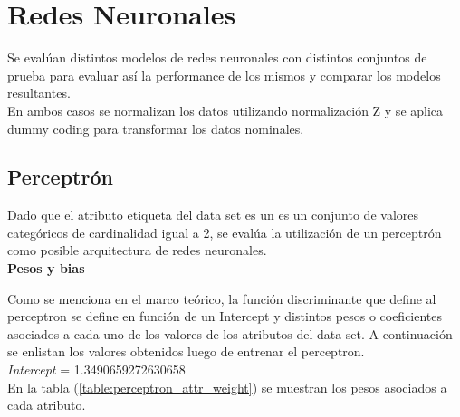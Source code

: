 \documentclass[osajnl,twocolumn,showpacs,superscriptaddress,10pt,floatfix]{revtex4-1} %
\begin{document}
\section{Redes Neuronales}

Se evalúan distintos modelos de redes neuronales con distintos conjuntos de prueba para evaluar así la performance de los mismos y comparar los modelos resultantes. \\

En ambos casos se normalizan los datos utilizando normalización Z y se aplica dummy coding para transformar los datos nominales. \\

\subsection{Perceptrón}

Dado que el atributo etiqueta del data set es un es un conjunto de valores categóricos de cardinalidad igual a 2, se evalúa la utilización de un perceptrón como posible arquitectura de redes neuronales. \\

\textbf{Pesos y bias}

Como se menciona en el marco teórico, la función discriminante que define al perceptron se define en función de un Intercept y distintos pesos o coeficientes asociados a cada uno de los valores de los atributos del data set. A continuación se enlistan los valores obtenidos luego de entrenar el perceptron. \\

\textit{Intercept} = 1.3490659272630658 \\

En la tabla (\ref{table:perceptron_attr_weight}) se muestran los pesos asociados a cada atributo. \\
\end{document}
